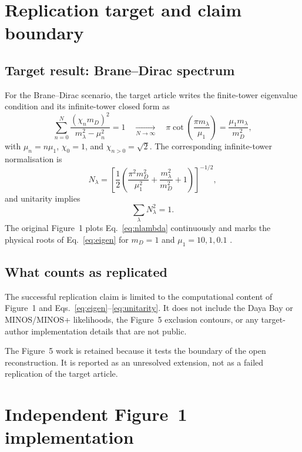 \section{Replication target and claim boundary}\label{sec:scope}

\subsection{Target result: Brane--Dirac spectrum}\label{sec:target-spectrum}

For the Brane--Dirac scenario, the target article writes the finite-tower eigenvalue condition and its infinite-tower closed form as \autocite{degiorgi2026}
\begin{equation}
\sum_{n=0}^{N}\frac{(\chi_n m_D)^2}{m_\lambda^2-\mu_n^2}=1
\quad \xrightarrow[N\to\infty]{} \quad
\pi\cot\!\left(\frac{\pi m_\lambda}{\mu_1}\right)
=\frac{\mu_1m_\lambda}{m_D^2},
\label{eq:eigen}
\end{equation}
with $\mu_n=n\mu_1$, $\chi_0=1$, and $\chi_{n>0}=\sqrt{2}$. The corresponding infinite-tower normalisation is
\begin{equation}
N_\lambda=
\left[\frac{1}{2}\left(
\frac{\pi^2m_D^2}{\mu_1^2}
+\frac{m_\lambda^2}{m_D^2}+1
\right)\right]^{-1/2},
\label{eq:nlambda}
\end{equation}
and unitarity implies
\begin{equation}
\sum_\lambda N_\lambda^2=1.
\label{eq:unitarity}
\end{equation}
The original Figure~1 plots Eq.~\eqref{eq:nlambda} continuously and marks the physical roots of Eq.~\eqref{eq:eigen} for $m_D=1$ and $\mu_1=10,1,0.1$ \autocite{degiorgi2026}.

\subsection{What counts as replicated}\label{sec:what-replicated}

The successful replication claim is limited to the computational content of Figure~1 and Eqs.~\eqref{eq:eigen}--\eqref{eq:unitarity}. It does not include the Daya Bay or MINOS/MINOS+ likelihoods, the Figure~5 exclusion contours, or any target-author implementation details that are not public.

The Figure~5 work is retained because it tests the boundary of the open reconstruction. It is reported as an unresolved extension, not as a failed replication of the target article.

\section{Independent Figure~1 implementation}\label{sec:methods-fig1}

